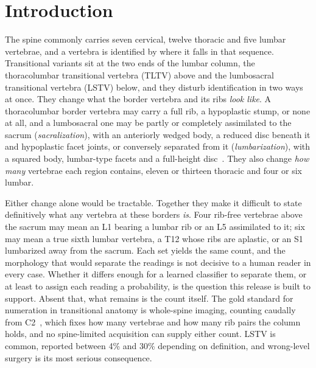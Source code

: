 \documentclass[aapm,mph,amsmath,amssymb,reprint]{revtex4-2}
\begin{document}
\maketitle

\section{Introduction}

The spine commonly carries seven cervical, twelve thoracic and five lumbar vertebrae, and a
vertebra is identified by where it falls in that sequence. Transitional variants sit at the
two ends of the lumbar column, the thoracolumbar transitional vertebra (TLTV) above and the
lumbosacral transitional vertebra (LSTV) below, and they disturb identification in two
ways at once. They change what the border vertebra and its ribs \emph{look like}. A thoracolumbar border vertebra may carry a full rib, a hypoplastic stump, or none at all, and
a lumbosacral one may be partly or completely assimilated to the sacrum
(\emph{sacralization}), with an anteriorly wedged body, a reduced disc beneath it and
hypoplastic facet joints, or conversely separated from it (\emph{lumbarization}), with a
squared body, lumbar-type facets and a full-height disc~\cite{koninwalz2010}. They also
change \emph{how many} vertebrae each region contains, eleven or thirteen thoracic and four or six lumbar.

Either change alone would be tractable. Together they make it difficult to state definitively
what any vertebra at these borders \emph{is}. Four rib-free vertebrae above the sacrum may mean
an L1 bearing a lumbar rib or an L5 assimilated to it; six may mean a true sixth lumbar
vertebra, a T12 whose ribs are aplastic, or an S1 lumbarized away from the sacrum. Each
set yields the same count, and the morphology that would separate the readings is not
decisive to a human reader in every case. Whether it differs enough for a learned classifier to separate them, or at
least to assign each reading a probability, is the question this release is built to
support. Absent that, what remains is the count itself. The gold standard for numeration in
transitional anatomy is whole-spine imaging, counting caudally from C2~\cite{lian2018},
which fixes how many vertebrae and how many rib pairs the column holds, and no
spine-limited acquisition can supply either count. LSTV is common,
reported between 4\% and 30\% depending on definition, and wrong-level surgery is its most
serious consequence.
\end{document}
